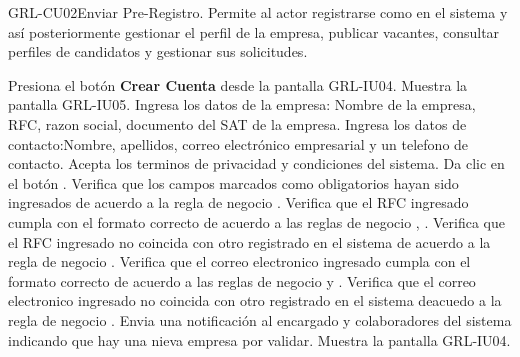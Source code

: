 \begin{UseCase}[]{GRL-CU02}{Enviar Pre-Registro.}{
	Permite al actor registrarse como en el sistema y así posteriormente gestionar el perfil de la empresa, 
	publicar  vacantes, consultar perfiles de candidatos y gestionar sus solicitudes.
}
\end{UseCase}

\begin{UCtrayectoria}
	\UCpaso [\UCactor] Presiona el botón \textbf{Crear Cuenta} desde la pantalla GRL-IU04.
    \UCpaso [\UCsist] Muestra la pantalla GRL-IU05.
	\UCpaso [\UCactor] Ingresa los datos de la empresa: Nombre de la empresa, RFC, razon social, documento del SAT de la empresa.\label{cu02-grl1}
	\UCpaso [\UCactor] Ingresa los datos de contacto:Nombre, apellidos, correo electrónico empresarial y un telefono de contacto.
	\UCpaso [\UCactor] Acepta los terminos de privacidad y condiciones del sistema.
	\UCpaso [\UCactor] Da clic en el botón . 
    \UCpaso [\UCsist] Verifica que los campos marcados como obligatorios hayan sido ingresados de acuerdo a la
	regla de negocio .
	\UCpaso [\UCsist] Verifica que el RFC ingresado cumpla con el formato correcto de acuerdo a las reglas de negocio  , .
	\UCpaso [\UCsist] Verifica que el RFC ingresado no coincida con otro registrado en el sistema de acuerdo a la regla de negocio  .
	\UCpaso [\UCsist] Verifica que el correo electronico ingresado cumpla con el formato correcto de acuerdo a las reglas de negocio   y  . \label{cu02-grl2}
	\UCpaso [\UCsist] Verifica que el correo electronico ingresado no coincida con otro registrado en el sistema deacuedo a la regla de negocio  .
	\UCpaso [\UCsist] Envia una notificación al encargado y colaboradores del sistema indicando que hay una nieva empresa por validar.
    \UCpaso [\UCsist] Muestra la pantalla GRL-IU04.
\end{UCtrayectoria}

